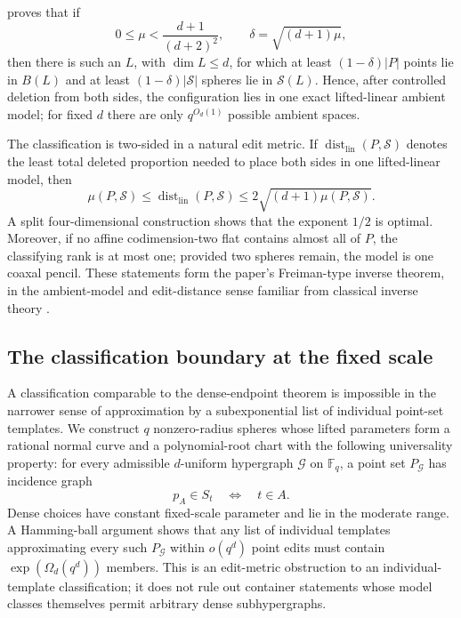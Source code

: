 \documentclass[11pt,letterpaper]{amsart}
\theoremstyle{definition}
\theoremstyle{remark}
\newcommand{\1}{\mathbf 1}
\begin{document}
 proves that if
\[
 0\le\mu<\frac{d+1}{(d+2)^2},
 \qquad
 \delta=\sqrt{(d+1)\mu},
\]
then there is such an $L$, with $\dim L\le d$, for which at least $(1-\delta)|P|$ points lie in $B(L)$ and at least $(1-\delta)|\mathcal S|$ spheres lie in $\mathcal S(L)$.  Hence, after controlled deletion from both sides, the configuration lies in one exact lifted-linear ambient model; for fixed $d$ there are only $q^{O_d(1)}$ possible ambient spaces.

The classification is two-sided in a natural edit metric.  If $\operatorname{dist}_{\mathrm{lin}}(P,\mathcal S)$ denotes the least total deleted proportion needed to place both sides in one lifted-linear model, then
\[
 \mu(P,\mathcal S)
 \le \operatorname{dist}_{\mathrm{lin}}(P,\mathcal S)
 \le 2\sqrt{(d+1)\mu(P,\mathcal S)}.
\]
A split four-dimensional construction shows that the exponent $1/2$ is optimal.  Moreover, if no affine codimension-two flat contains almost all of $P$, the classifying rank is at most one; provided two spheres remain, the model is one coaxal pencil.  These statements form the paper's Freiman-type inverse theorem, in the ambient-model and edit-distance sense familiar from classical inverse theory \cite{GR,GT}.

\subsection{The classification boundary at the fixed scale}

A classification comparable to the dense-endpoint theorem is impossible in the narrower sense of approximation by a subexponential list of individual point-set templates.  We construct $q$ nonzero-radius spheres whose lifted parameters form a rational normal curve and a polynomial-root chart with the following universality property: for every admissible $d$-uniform hypergraph $\mathcal G$ on $\mathbb F_q$, a point set $P_{\mathcal G}$ has incidence graph
\[
 p_A\in S_t\quad\Longleftrightarrow\quad t\in A.
\]
Dense choices have constant fixed-scale parameter and lie in the moderate range.  A Hamming-ball argument shows that any list of individual templates approximating every such $P_{\mathcal G}$ within $o(q^d)$ point edits must contain $\exp(\Omega_d(q^d))$ members.  This is an edit-metric obstruction to an individual-template classification; it does not rule out container statements whose model classes themselves permit arbitrary dense subhypergraphs.
\end{document}
